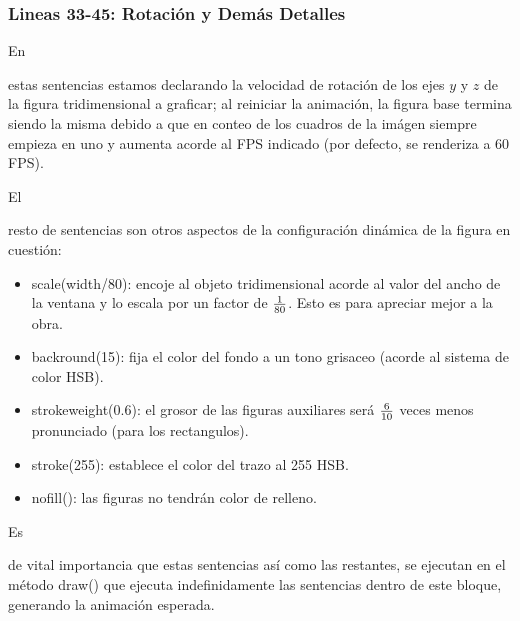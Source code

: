 \documentclass[stu, 12pt, letterpaper, donotrepeattitle, floatsintext]{apa7}
\begin{document}
    \subsubsection*{Lineas 33-45: Rotación y Demás Detalles}
    En \begin{justifying}
      estas sentencias estamos declarando la velocidad de rotación de los ejes \(y\) y \(z\) de la figura tridimensional a graficar; al reiniciar la animación,
    la figura base termina siendo la misma debido a que en conteo de los cuadros de la imágen siempre empieza en uno y aumenta acorde al FPS indicado (por defecto, 
    se renderiza a 60 FPS).\par
    \end{justifying}
    El \begin{justifying}
      resto de sentencias son otros aspectos de la configuración dinámica de la figura en cuestión:
    \begin{itemize}
      \item {\selectfont scale(width/80)}: encoje al objeto tridimensional acorde al valor del ancho de la ventana y lo escala por un factor de \({1\over80}\). Esto es para apreciar mejor a la obra.
      \item {\selectfont backround(15)}: fija el color del fondo a un tono grisaceo (acorde al sistema de color HSB).
      \item {\selectfont strokeweight(0.6)}: el grosor de las figuras auxiliares será \({6\over10}\) veces menos pronunciado (para los rectangulos).
      \item {\selectfont stroke(255)}: establece el color del trazo al 255 HSB.
      \item {\selectfont nofill()}: las figuras no tendrán color de relleno.
    \end{itemize}\par
    \end{justifying}
    Es \begin{justifying}
      de vital importancia que estas sentencias así como las restantes, se ejecutan en el método {\selectfont draw()} que ejecuta
    indefinidamente las sentencias dentro de este bloque, generando la animación esperada.\par
    \end{justifying}
    \vspace{\baselineskip}
\end{document}
